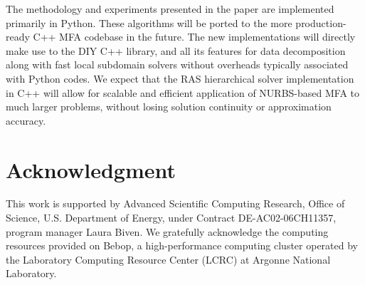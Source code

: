 \documentclass[conference]{IEEEtran}
\begin{document}
The methodology and experiments presented in the paper are implemented primarily in Python. 
These algorithms will be ported to the more production-ready C++ MFA codebase \cite{mfa-codebase} in the future. The new implementations will directly make use to the DIY C++ library, and all its features for data decomposition along with fast local subdomain solvers without overheads typically associated with Python codes. We expect that the RAS hierarchical solver implementation in C++ will allow for scalable and efficient application of NURBS-based MFA to much larger problems, without losing solution continuity or approximation accuracy.



\section*{Acknowledgment}

This work is supported by Advanced Scientific Computing Research, Office of Science, U.S. Department of Energy, under
Contract DE-AC02-06CH11357, program manager Laura Biven. We gratefully acknowledge the computing resources provided on
Bebop, a high-performance computing cluster operated by the Laboratory Computing Resource Center (LCRC) at Argonne
National Laboratory.




\end{document}
